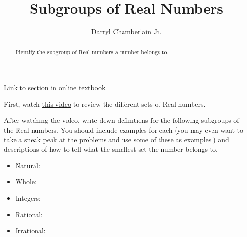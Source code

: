 \documentclass{ximera}
\author{Darryl Chamberlain Jr.}
\title{Subgroups of Real Numbers}
\begin{document}
\begin{abstract}
Identify the subgroup of Real numbers a number belongs to. 
\end{abstract}
\maketitle

\href{https://cnx.org/contents/mwjClAV_@8.1:0KhpF2RH@23/Real-Numbers-Algebra-Essentials}{Link to section in online textbook}

First, watch \href{https://mediasite.video.ufl.edu/Mediasite/Play/67aa041fe31847d7be8047e131f256b71d}{this video} to review the different sets of Real numbers. 

After watching the video, write down definitions for the following subgroups of the Real numbers. You should include examples for each (you may even want to take a sneak peak at the problems and use some of these as examples!) and descriptions of how to tell what the smallest set the number belongs to. 

\begin{itemize}
\item Natural: 
\item Whole:
\item Integers:
\item Rational:
\item Irrational:
\end{itemize}
\end{document}
